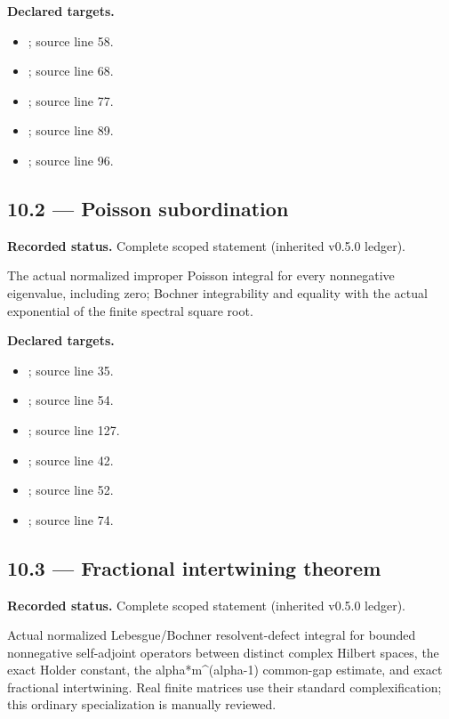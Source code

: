 \textbf{Declared targets.}\begin{itemize}
\item {}; source line 58.
\item {}; source line 68.
\item {}; source line 77.
\item {}; source line 89.
\item {}; source line 96.
\end{itemize}
\subsection{10.2 — Poisson subordination}
\label{result:10.2}
\textbf{Recorded status.} Complete scoped statement (inherited v0.5.0 ledger).\par
The actual normalized improper Poisson integral for every nonnegative eigenvalue, including zero; Bochner integrability and equality with the actual exponential of the finite spectral square root.

\textbf{Declared targets.}\begin{itemize}
\item {}; source line 35.
\item {}; source line 54.
\item {}; source line 127.
\item {}; source line 42.
\item {}; source line 52.
\item {}; source line 74.
\end{itemize}
\subsection{10.3 — Fractional intertwining theorem}
\label{result:10.3}
\textbf{Recorded status.} Complete scoped statement (inherited v0.5.0 ledger).\par
Actual normalized Lebesgue/Bochner resolvent-defect integral for bounded nonnegative self-adjoint operators between distinct complex Hilbert spaces, the exact Holder constant, the alpha*m\textasciicircum{}(alpha-1) common-gap estimate, and exact fractional intertwining. Real finite matrices use their standard complexification; this ordinary specialization is manually reviewed.

